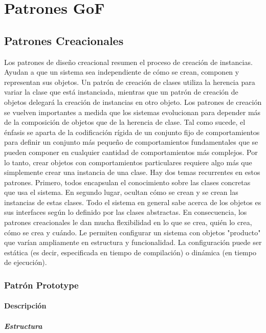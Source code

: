 \chapter{Patrones GoF}
\section{Patrones Creacionales}
Los patrones de diseño creacional resumen el proceso de creación de instancias. Ayudan a que un sistema sea independiente de cómo se crean, componen y representan sus objetos. Un patrón de creación de clases utiliza la herencia para variar la clase que está instanciada, mientras que un patrón de creación de objetos delegará la creación de instancias en otro objeto. Los patrones de creación se vuelven importantes a medida que los sistemas evolucionan para depender más de la composición de objetos que de la herencia de clase. Tal como sucede, el énfasis se aparta de la codificación rígida de un conjunto fijo de comportamientos para definir un conjunto más pequeño de comportamientos fundamentales que se pueden componer en cualquier cantidad de comportamientos más complejos. Por lo tanto, crear objetos con comportamientos particulares requiere algo más que simplemente crear una instancia de una clase. Hay dos temas recurrentes en estos patrones. Primero, todos encapsulan el conocimiento sobre las clases concretas que usa el sistema. En segundo lugar, ocultan cómo se crean y se crean las instancias de estas clases. Todo el sistema en general sabe acerca de los objetos es sus interfaces según lo definido por las clases abstractas. En consecuencia, los patrones creacionales le dan mucha flexibilidad en lo que se crea, quién lo crea, cómo se crea y cuándo. Le permiten configurar un sistema con objetos "producto" que varían ampliamente en estructura y funcionalidad. La configuración puede ser estática (es decir, especificada en tiempo de compilación) o dinámica (en tiempo de ejecución).\cite{gof}
\subsection{Patrón Prototype}
\subsubsection{Descripción}

\paragraph{Estructura}

